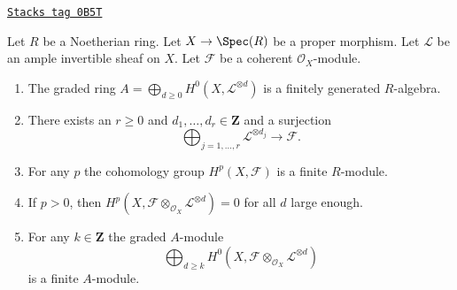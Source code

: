 \begin{lemma}
\label{coherent-lemma-coherent-proper-ample}
\href{https://stacks.math.columbia.edu/tag/0B5T}{\texttt{Stacks tag 0B5T}}

Let $R$ be a Noetherian ring. Let $X \to \Spec(R)$ be a proper morphism.
Let $\mathcal{L}$ be an ample invertible sheaf on $X$. Let $\mathcal{F}$
be a coherent $\mathcal{O}_X$-module.
\begin{enumerate}
\item The graded ring
$A = \bigoplus_{d \geq 0} H^0(X, \mathcal{L}^{\otimes d})$
is a finitely generated $R$-algebra.
\item There exists an $r \geq 0$ and
$d_1, \ldots, d_r \in \mathbf{Z}$ and a surjection
$$
\bigoplus\nolimits_{j = 1, \ldots, r} \mathcal{L}^{\otimes d_j}
\longrightarrow \mathcal{F}.
$$
\item For any $p$ the cohomology group $H^p(X, \mathcal{F})$ is a finite
$R$-module.
\item If $p > 0$, then
$H^p(X, \mathcal{F} \otimes_{\mathcal{O}_X} \mathcal{L}^{\otimes d}) = 0$
for all $d$ large enough.
\item For any $k \in \mathbf{Z}$ the graded $A$-module
$$
\bigoplus\nolimits_{d \geq k}
H^0(X, \mathcal{F} \otimes_{\mathcal{O}_X} \mathcal{L}^{\otimes d})
$$
is a finite $A$-module.
\end{enumerate}
\end{lemma}

